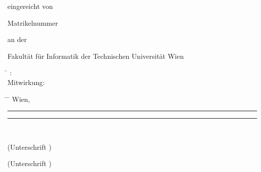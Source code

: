 \begin{otherlanguage}{ngerman}
\begin{center}
\vspace{6mm}

{\thesistitlefontLarge\sffamily\bfseries \tuinfthesiscurriculum}

\vspace{6.5mm}

{\thesistitlefontlarge\sffamily eingereicht von}

\vspace{6mm}

{\thesistitlefontLarge\sffamily\bfseries \tuinfthesisauthor}

\vspace{1.5mm}

{\thesistitlefontlarge\sffamily Matrikelnummer \tuinfthesismatrikelno} 

\vspace{1.4cm}

\begin{minipage}[t][1.6cm][t]{\textwidth}%
  \vspace{0pt}\raggedright\thesistitlefontnormalsize\sffamily
  an der

  Fakult\"{a}t f\"{u}r Informatik der Technischen Universit\"{a}t Wien
\end{minipage}
\end{center}

\begin{minipage}[t][4cm][t]{\textwidth}%
  \vspace{0pt}\raggedright\thesistitlefontnormalsize\sffamily
  \begin{tabbing}%
	    \hspace{19mm} \= \hspace{66mm} \kill
	    \tuinfthesisbetreuung: \> \tuinfthesisbetreins\\
	    \ifAssistance
	    Mitwirkung: \> \tuinfthesisbetrzwei\\
	                \> \tuinfthesisbetrdrei
	    \fi
  \end{tabbing}
\end{minipage}

\begin{minipage}[t][1.5cm][t]{\textwidth}%
  \vspace{0pt}\sffamily\thesistitlefontnormalsize
  \begin{tabbing}%
    \hspace{45mm} \= \hspace{63mm} \= \hspace{51mm} \kill
    Wien, \tuinfthesisdate \> {\raggedright\rule{51mm}{0.5pt}} \> {\raggedright\rule{51mm}{0.5pt}} \\
    \> \begin{minipage}[t][0.5cm][t]{51mm}\centering (Unterschrift \tuinfthesisverfassung)\end{minipage}
    \> \begin{minipage}[t][0.5cm][t]{51mm}\centering (Unterschrift \tuinfthesisbetreuung)\end{minipage}
    \end{tabbing}
\end{minipage}


\end{otherlanguage}

